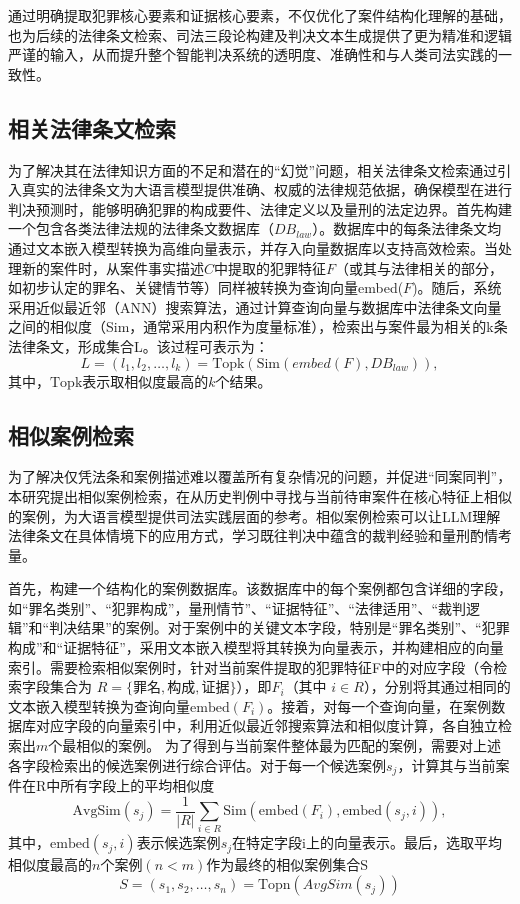 通过明确提取犯罪核心要素和证据核心要素，不仅优化了案件结构化理解的基础，也为后续的法律条文检索、司法三段论构建及判决文本生成提供了更为精准和逻辑严谨的输入，从而提升整个智能判决系统的透明度、准确性和与人类司法实践的一致性。
\subsection{\heiti 相关法律条文检索}
为了解决其在法律知识方面的不足和潜在的“幻觉”问题，相关法律条文检索通过引入真实的法律条文为大语言模型提供准确、权威的法律规范依据，确保模型在进行判决预测时，能够明确犯罪的构成要件、法律定义以及量刑的法定边界。首先构建一个包含各类法律法规的法律条文数据库（$DB_{law}$​）。数据库中的每条法律条文均通过文本嵌入模型转换为高维向量表示，并存入向量数据库以支持高效检索。当处理新的案件时，从案件事实描述$C$中提取的犯罪特征$F$（或其与法律相关的部分，如初步认定的罪名、关键情节等）同样被转换为查询向量embed($F$)。随后，系统采用近似最近邻（ANN）搜索算法，通过计算查询向量与数据库中法律条文向量之间的相似度（Sim，通常采用内积作为度量标准），检索出与案件最为相关的k条法律条文，形成集合L。该过程可表示为：
$$
L=(l_1​,l_2​,\dots,l_k​)=\text{Topk}​(\text{Sim}(embed(F),DB_{law})),
$$
其中，$\text{Topk}​$表示取相似度最高的$k$个结果。
\subsection{\heiti 相似案例检索}
为了解决仅凭法条和案例描述难以覆盖所有复杂情况的问题，并促进“同案同判”， 本研究提出相似案例检索，在从历史判例中寻找与当前待审案件在核心特征上相似的案例，为大语言模型提供司法实践层面的参考。相似案例检索可以让LLM理解法律条文在具体情境下的应用方式，学习既往判决中蕴含的裁判经验和量刑酌情考量。

首先，构建一个结构化的案例数据库。该数据库中的每个案例都包含详细的字段，如“罪名类别”、“犯罪构成”，量刑情节”、“证据特征”、“法律适用”、“裁判逻辑”和“判决结果”的案例。对于案例中的关键文本字段，特别是“罪名类别”、“犯罪构成”和“证据特征”，采用文本嵌入模型将其转换为向量表示，并构建相应的向量索引。需要检索相似案例时，针对当前案件提取的犯罪特征F中的对应字段（令检索字段集合为 $R=\{\text{罪名},\text{构成},\text{证据}\}$），即$F_{i}$​（其中 $i \in R$），分别将其通过相同的文本嵌入模型转换为查询向量$\text{embed}(F_{i})$。接着，对每一个查询向量，在案例数据库对应字段的向量索引中，利用近似最近邻搜索算法和相似度计算，各自独立检索出$m$个最相似的案例。
为了得到与当前案件整体最为匹配的案例，需要对上述各字段检索出的候选案例进行综合评估。对于每一个候选案例$s_j$​，计算其与当前案件在R中所有字段上的平均相似度
$$
	\text{AvgSim}(s_j​)=\frac{1}{|R|}\sum_{i\in R}\text{​Sim}(\text{embed}(F_{i}​),\text{embed}(s_j,i)),
$$
其中，$\text{embed}(s_j,i)$表示候选案例$s_j$​在特定字段$\text{i}$上的向量表示。最后，选取平均相似度最高的$n$个案例$(n<m)$作为最终的相似案例集合S
$$
	S=(s_1​,s_2​,\dots,s_n​)=\text{Topn​}(AvgSim(s_j​))
$$

